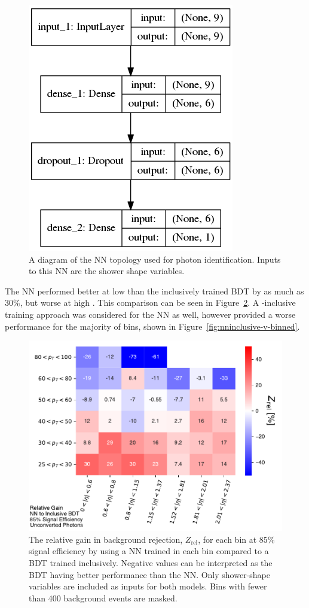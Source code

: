 
\begin{figure}[!htbp]
    \centering
    \includegraphics[width=.30\textwidth]{chapters/chapter4_photonID/images/model.png}
    \caption[A diagram of the \gls{NN} topology used for photon identification]
    {A diagram of the \gls{NN} topology used for photon identification. Inputs to this \gls{NN} are the shower shape variables.}
    \label{fig:nn-model}
\end{figure}

The \gls{NN} performed better at low \pt than the inclusively trained \gls{BDT} by as much as 30\%, but worse at high \pt. This comparison can be seen in Figure~\ref{fig:nn-v-bdt-unconverted}. A \pt-inclusive training approach was considered for the \gls{NN} as well, however provided a worse performance for the majority of \etaPt bins, shown in Figure~\ref{fig:nninclusive-v-binned}.

\begin{figure}[!htbp]
    \centering
    \includegraphics[width=.85\textwidth]{chapters/chapter4_photonID/images/NN_v_BDTinclusive_normed.pdf}
    \caption[The relative gain in background rejection by using a \gls{NN} trained bin-wise compared to a \gls{BDT} trained inclusively]
    {The relative gain in background rejection, $Z_{\text{rel}}$, for each \etaPt bin at 85\% signal efficiency by using a \gls{NN} trained in each \etaPt bin compared to a \gls{BDT} trained inclusively. Negative values can be interpreted as the \gls{BDT} having better performance than the \gls{NN}. Only shower-shape variables are included as inputs for both models. Bins with fewer than 400 background events are masked.}
    \label{fig:nn-v-bdt-unconverted}
\end{figure}


